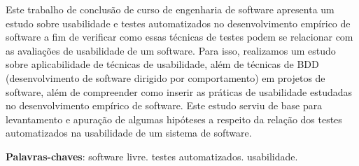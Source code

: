 \begin{resumo}

Este trabalho de conclusão de curso de engenharia de software apresenta um estudo sobre usabilidade e testes automatizados no desenvolvimento empírico de software a fim de verificar como essas técnicas de testes podem se relacionar com as avaliações de usabilidade de um software. Para isso, realizamos um estudo sobre aplicabilidade de técnicas de usabilidade, além de técnicas de BDD (desenvolvimento de software dirigido por comportamento) em projetos de software, além de compreender como inserir as práticas de usabilidade estudadas no desenvolvimento empírico de software. 
Este estudo serviu de base para levantamento e apuração de algumas hipóteses a respeito da relação dos testes automatizados na usabilidade de um sistema de software.


\vspace{\onelineskip}
    
 \noindent
 \textbf{Palavras-chaves}: software livre. testes automatizados. usabilidade.

\end{resumo}
